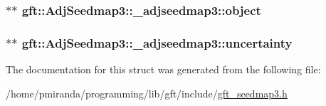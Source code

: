 \subsubsection[{\texorpdfstring{object}{object}}]{$\ast$$\ast$ gft\+::\+Adj\+Seedmap3\+::\+\_\+adjseedmap3\+::object}\hypertarget{structgft_1_1AdjSeedmap3_1_1__adjseedmap3_a13f54f99f6a0b373577e69675ba3f989}{}\label{structgft_1_1AdjSeedmap3_1_1__adjseedmap3_a13f54f99f6a0b373577e69675ba3f989}
\subsubsection[{\texorpdfstring{uncertainty}{uncertainty}}]{$\ast$$\ast$ gft\+::\+Adj\+Seedmap3\+::\+\_\+adjseedmap3\+::uncertainty}\hypertarget{structgft_1_1AdjSeedmap3_1_1__adjseedmap3_a52a87c951c6dc129f925c652464ec475}{}\label{structgft_1_1AdjSeedmap3_1_1__adjseedmap3_a52a87c951c6dc129f925c652464ec475}


The documentation for this struct was generated from the following file\+:\begin{DoxyCompactItemize}
\item 
/home/pmiranda/programming/lib/gft/include/\hyperlink{gft__seedmap3_8h}{gft\+\_\+seedmap3.\+h}\end{DoxyCompactItemize}
